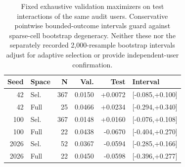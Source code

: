 \begin{table}[t]
\centering
\caption{Fixed exhaustive validation maximizers on test interactions of the same audit users. Conservative pointwise bounded-outcome intervals guard against sparse-cell bootstrap degeneracy. Neither these nor the separately recorded 2,000-resample bootstrap intervals adjust for adaptive selection or provide independent-user confirmation.}
\label{tab:extended-confirmation}
\small
\begin{tabular}{rlrrrl}
\toprule
Seed & Space & N & Val. & Test & Interval \\
\midrule
42 & Sel. & 367 & 0.0150 & +0.0072 & [-0.085,+0.100] \\
42 & Full & 25 & 0.0466 & +0.0234 & [-0.294,+0.340] \\
100 & Sel. & 367 & 0.0148 & +0.0160 & [-0.076,+0.108] \\
100 & Full & 22 & 0.0438 & -0.0670 & [-0.404,+0.270] \\
2026 & Sel. & 52 & 0.0367 & -0.0594 & [-0.285,+0.166] \\
2026 & Full & 22 & 0.0450 & -0.0598 & [-0.396,+0.277] \\
\bottomrule
\end{tabular}
\end{table}
